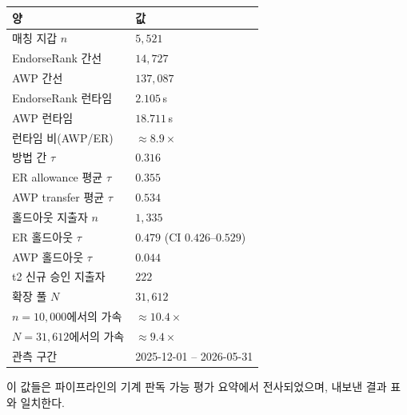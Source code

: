 \begin{center}
\begin{tabular}{ll}
\toprule
양 & 값 \\
\midrule
매칭 지갑 $n$ & $5{,}521$ \\
EndorseRank 간선 & $14{,}727$ \\
AWP 간선 & $137{,}087$ \\
EndorseRank 런타임 & $2.105$\,s \\
AWP 런타임 & $18.711$\,s \\
런타임 비(AWP/ER) & $\approx 8.9\times$ \\
방법 간 $\tau$ & $0.316$ \\
ER allowance 평균 $\tau$ & $0.355$ \\
AWP transfer 평균 $\tau$ & $0.534$ \\
홀드아웃 지출자 $n$ & $1{,}335$ \\
ER 홀드아웃 $\tau$ & $0.479$ (CI $0.426$--$0.529$) \\
AWP 홀드아웃 $\tau$ & $0.044$ \\
t2 신규 승인 지출자 & $222$ \\
확장 풀 $N$ & $31{,}612$ \\
$n=10{,}000$에서의 가속 & $\approx 10.4\times$ \\
$N=31{,}612$에서의 가속 & $\approx 9.4\times$ \\
관측 구간 & 2025-12-01 -- 2026-05-31 \\
\bottomrule
\end{tabular}
\end{center}

이 값들은 파이프라인의 기계 판독 가능 평가 요약에서 전사되었으며, 내보낸 결과 표와 일치한다.
